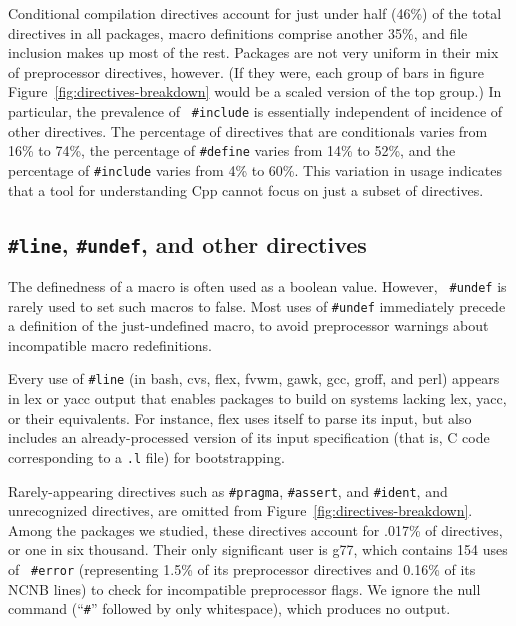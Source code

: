 \documentclass[10pt]{article}
\newcommand{\pkg}[1]{\textsf{#1}}
\begin{document}
Conditional compilation directives account for just under half (46\%) of
the total directives in all packages, macro definitions comprise another
35\%, and file inclusion makes up most of the rest.  Packages are not very
uniform in their mix of preprocessor directives, however.  (If they were,
each group of bars in figure Figure~\ref{fig:directives-breakdown} would be
a scaled version of the top group.)  In particular, the prevalence of {\tt
\#include} is essentially independent of incidence of other directives.
The percentage of directives that are conditionals varies from 16\% to
74\%, the percentage of {\tt \#define} varies from 14\% to 52\%, and the
percentage of {\tt \#include} varies from 4\% to 60\%.  This variation in
usage indicates that a tool for understanding Cpp cannot focus on just a
subset of directives.


\subsection{{\tt \#line}, {\tt \#undef}, and other directives}

The definedness of a macro is often used as a boolean value.  However, {\tt
\#undef} is rarely used to set such macros to false.  Most uses of
{\tt \#undef} immediately precede a definition of the just-undefined macro,
to avoid preprocessor warnings about incompatible macro redefinitions.

Every use of {\tt \#line} (in \pkg{bash}, \pkg{cvs}, \pkg{flex}, \pkg{fvwm},
\pkg{gawk}, \pkg{gcc}, \pkg{groff}, and \pkg{perl}) appears in lex or yacc
output that enables packages to build on systems lacking lex, yacc, or
their equivalents.  For instance, \pkg{flex} uses itself to parse its
input, but also includes an already-processed version of its input
specification (that is, C code corresponding to a {\tt .l} file) for
bootstrapping.


Rarely-appearing directives such as {\tt \#pragma}, {\tt \#assert}, and
{\tt \#ident}, and unrecognized directives, are omitted from
Figure~\ref{fig:directives-breakdown}.  Among the packages we studied,
these directives account for .017\% of directives, or one in six thousand.
Their only significant user is \pkg{g77}, which contains 154 uses of {\tt
\#error} (representing 1.5\% of its preprocessor directives and 0.16\% of
its NCNB lines) to check for incompatible preprocessor flags.  We ignore
the null command (``{\tt \#}'' followed by only whitespace), which produces
no output.
\end{document}
